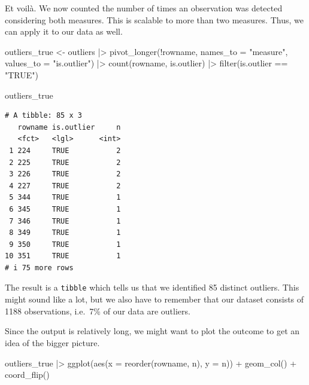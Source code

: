 \documentclass[
  letterpaper,
  DIV=11,
  numbers=noendperiod]{scrreprt}
\newenvironment{Shaded}{\begin{snugshade}}{\end{snugshade}}
\newcommand{\AttributeTok}[1]{\textcolor[rgb]{0.40,0.45,0.13}{#1}}
\newcommand{\FunctionTok}[1]{\textcolor[rgb]{0.28,0.35,0.67}{#1}}
\newcommand{\NormalTok}[1]{\textcolor[rgb]{0.00,0.23,0.31}{#1}}
\newcommand{\OtherTok}[1]{\textcolor[rgb]{0.00,0.23,0.31}{#1}}
\newcommand{\SpecialCharTok}[1]{\textcolor[rgb]{0.37,0.37,0.37}{#1}}
\newcommand{\StringTok}[1]{\textcolor[rgb]{0.13,0.47,0.30}{#1}}
\begin{document}
Et voilà. We now counted the number of times an observation was detected
considering both measures. This is scalable to more than two measures.
Thus, we can apply it to our data as well.

\begin{Shaded}
\begin{Highlighting}[]
\NormalTok{outliers\_true }\OtherTok{\textless{}{-}}
\NormalTok{  outliers }\SpecialCharTok{|\textgreater{}}
  \FunctionTok{pivot\_longer}\NormalTok{(}\SpecialCharTok{!}\NormalTok{rowname,}
               \AttributeTok{names\_to =} \StringTok{"measure"}\NormalTok{,}
               \AttributeTok{values\_to =} \StringTok{"is.outlier"}\NormalTok{) }\SpecialCharTok{|\textgreater{}}
  \FunctionTok{count}\NormalTok{(rowname, is.outlier) }\SpecialCharTok{|\textgreater{}}
  \FunctionTok{filter}\NormalTok{(is.outlier }\SpecialCharTok{==} \StringTok{"TRUE"}\NormalTok{)}

\NormalTok{outliers\_true}
\end{Highlighting}
\end{Shaded}

\begin{verbatim}
# A tibble: 85 x 3
   rowname is.outlier     n
   <fct>   <lgl>      <int>
 1 224     TRUE           2
 2 225     TRUE           2
 3 226     TRUE           2
 4 227     TRUE           2
 5 344     TRUE           1
 6 345     TRUE           1
 7 346     TRUE           1
 8 349     TRUE           1
 9 350     TRUE           1
10 351     TRUE           1
# i 75 more rows
\end{verbatim}

The result is a \texttt{tibble} which tells us that we identified 85
distinct outliers. This might sound like a lot, but we also have to
remember that our dataset consists of 1188 observations, i.e.~7\% of our
data are outliers.

Since the output is relatively long, we might want to plot the outcome
to get an idea of the bigger picture.

\begin{Shaded}
\begin{Highlighting}[]
\NormalTok{outliers\_true }\SpecialCharTok{|\textgreater{}}
  \FunctionTok{ggplot}\NormalTok{(}\FunctionTok{aes}\NormalTok{(}\AttributeTok{x =} \FunctionTok{reorder}\NormalTok{(rowname, n),}
             \AttributeTok{y =}\NormalTok{ n)) }\SpecialCharTok{+}
  \FunctionTok{geom\_col}\NormalTok{() }\SpecialCharTok{+}
  \FunctionTok{coord\_flip}\NormalTok{()}
\end{Highlighting}
\end{Shaded}
\end{document}
